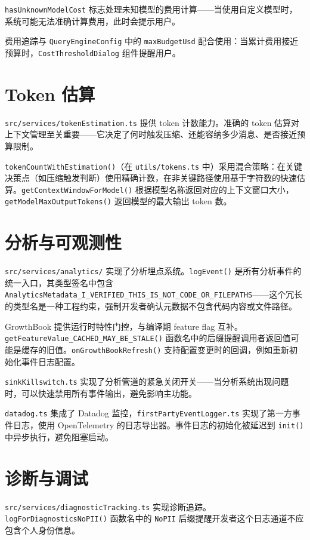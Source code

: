 \texttt{hasUnknownModelCost} 标志处理未知模型的费用计算——当使用自定义模型时，系统可能无法准确计算费用，此时会提示用户。

费用追踪与 \texttt{QueryEngineConfig} 中的 \texttt{maxBudgetUsd} 配合使用：当累计费用接近预算时，\texttt{CostThresholdDialog} 组件提醒用户。

\section{Token 估算}

\texttt{src/services/tokenEstimation.ts} 提供 token 计数能力。准确的 token 估算对上下文管理至关重要——它决定了何时触发压缩、还能容纳多少消息、是否接近预算限制。

\texttt{tokenCountWithEstimation()}（在 \texttt{utils/tokens.ts} 中）采用混合策略：在关键决策点（如压缩触发判断）使用精确计数，在非关键路径使用基于字符数的快速估算。\texttt{getContextWindowForModel()} 根据模型名称返回对应的上下文窗口大小，\texttt{getModelMaxOutputTokens()} 返回模型的最大输出 token 数。

\section{分析与可观测性}

\texttt{src/services/analytics/} 实现了分析埋点系统。\texttt{logEvent()} 是所有分析事件的统一入口，其类型签名中包含 \texttt{AnalyticsMetadata\_I\_VERIFIED\_THIS\_IS\_NOT\_CODE\_OR\_FILEPATHS}——这个冗长的类型名是一种工程约束，强制开发者确认元数据不包含代码内容或文件路径。

GrowthBook 提供运行时特性门控，与编译期 feature flag 互补。\texttt{getFeatureValue\_CACHED\_MAY\_BE\_STALE()} 函数名中的后缀提醒调用者返回值可能是缓存的旧值。\texttt{onGrowthBookRefresh()} 支持配置变更时的回调，例如重新初始化事件日志配置。

\texttt{sinkKillswitch.ts} 实现了分析管道的紧急关闭开关——当分析系统出现问题时，可以快速禁用所有事件输出，避免影响主功能。

\texttt{datadog.ts} 集成了 Datadog 监控，\texttt{firstPartyEventLogger.ts} 实现了第一方事件日志，使用 OpenTelemetry 的日志导出器。事件日志的初始化被延迟到 \texttt{init()} 中异步执行，避免阻塞启动。

\section{诊断与调试}

\texttt{src/services/diagnosticTracking.ts} 实现诊断追踪。\texttt{logForDiagnosticsNoPII()} 函数名中的 \texttt{NoPII} 后缀提醒开发者这个日志通道不应包含个人身份信息。


